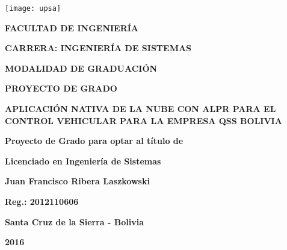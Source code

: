 {

\begin{titlepage}
    
    
    \begin{center}
        \texttt{[image: upsa]}
        
        \vspace{0.5cm}
            \large \textbf{FACULTAD DE INGENIERÍA}
            
            \textbf{CARRERA: INGENIERÍA DE SISTEMAS}
        
        \vspace{1cm}
            \textbf{MODALIDAD DE GRADUACIÓN}
            
            \textbf{PROYECTO DE GRADO}
        
        \vspace{1.3cm}
            \textbf{APLICACIÓN NATIVA DE LA NUBE CON ALPR PARA EL CONTROL VEHICULAR PARA LA EMPRESA QSS BOLIVIA}
        
        \vspace{1.5cm}
            \textbf{Proyecto de Grado para optar al título de}
        
            \textbf{Licenciado en Ingeniería de Sistemas}
        
        \vspace{1cm}
            \textbf{Juan Francisco Ribera Laszkowski}
            
            \textbf{Reg.: 2012110606}
        
        \vfill
            \textbf{Santa Cruz de la Sierra - Bolivia}
            
            \textbf{2016}
    \end{center}
\end{titlepage}

\restoregeometry
}